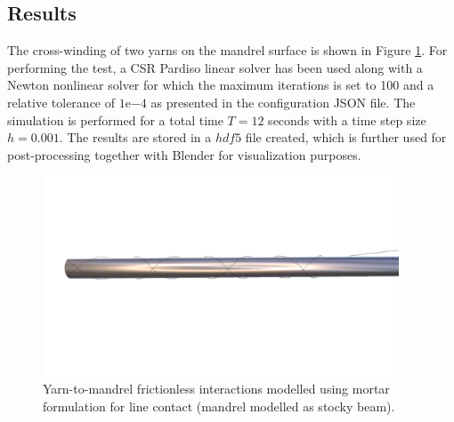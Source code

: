 \subsection{Results}
The cross-winding of two yarns on the mandrel surface is shown in Figure \ref{testsetup}. For performing the test, a CSR Pardiso linear solver has been used along with a Newton nonlinear solver for which the maximum iterations is set to 100 and a relative tolerance of $1\mathrm{e}{-4}$ as presented in the configuration JSON file. The simulation is performed for a total time $T = 12$ seconds with a time step size $h = 0.001$. The results are stored in a $hdf5$ file created, which is further used for post-processing together with Blender for visualization purposes.

\begin{figure}[h]
    \centering
    \includegraphics[width=400]{docs/figures/mortaryarnmandrel_1.png}
    \caption{Yarn-to-mandrel frictionless interactions modelled using mortar formulation for line contact (mandrel modelled as stocky beam).}
    \label{testsetup}
\end{figure}

















